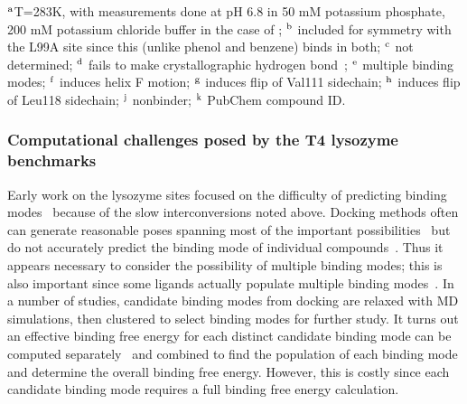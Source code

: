\documentclass[aps,pre,twocolumn,nofootinbib,superscriptaddress,10pt, final,tightenlines]{revtex4-1}
\begin{document}
\begin{table}
\begin{center}
\end{center}
$^{\rm a}$T=283K, with measurements done at pH 6.8 in 50 mM potassium phosphate, 200 mM potassium chloride buffer in the case of \cite{boyce_predicting_2009}; $^{\rm b}$ included for symmetry with the L99A site since this (unlike phenol and benzene) binds in both; $^{\rm c}$ not determined; $^{\rm d}$ fails to make crystallographic hydrogen bond~\cite{boyce_predicting_2009}; $^{\rm e}$ multiple binding modes; $^{\rm f}$ induces helix F motion; $^{\rm g}$ induces flip of Val111 sidechain; $^{\rm h}$ induces flip of Leu118 sidechain; $^{\rm j}$ nonbinder; $^{\rm k}$ PubChem compound ID.
\end{table}
\endgroup


\subsubsection{Computational challenges posed by the T4 lysozyme benchmarks}
Early work on the lysozyme sites focused on the difficulty of predicting binding modes~\cite{mobley_use_2006, mobley_predicting_2007, boyce_predicting_2009} because of the slow interconversions noted above. 
Docking methods often can generate reasonable poses spanning most of the important possibilities~\cite{mobley_use_2006, mobley_predicting_2007, boyce_predicting_2009, graves_rescoring_2008} but do not accurately predict the binding mode of individual compounds~\cite{mobley_predicting_2007, boyce_predicting_2009, graves_rescoring_2008}. 
Thus it appears necessary to consider the possibility of multiple binding modes; this is also important since some ligands actually populate multiple binding modes~\cite{boyce_predicting_2009}. 
In a number of studies, candidate binding modes from docking are relaxed with MD simulations, then clustered to select binding modes for further study. 
It turns out an effective binding free energy for each distinct candidate binding mode can be computed separately~\cite{mobley_use_2006} and combined to find the population of each binding mode and determine the overall binding free energy.
However, this is costly since each candidate binding mode requires a full binding free energy calculation.
\end{document}
